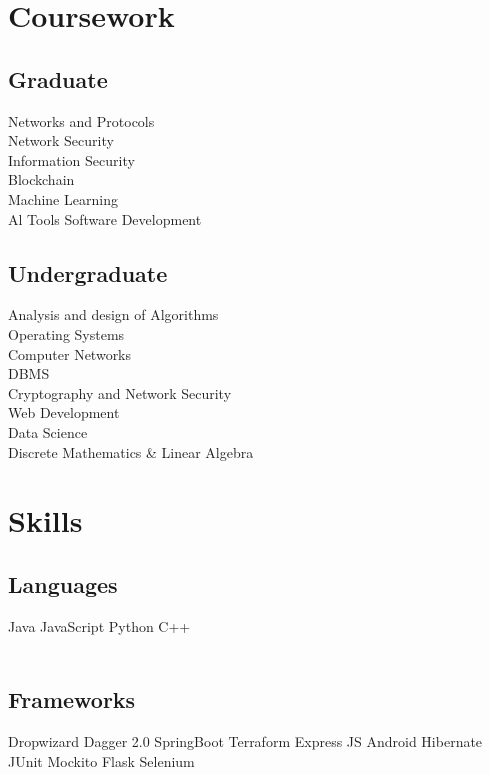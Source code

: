 \documentclass[]{resume-openfont}
\begin{document}
\begin{minipage}[t]{0.33\textwidth}

\section{Coursework}
\subsection{Graduate}
Networks and Protocols \\
Network Security \\
Information Security \\
Blockchain \\
Machine Learning \\
Al Tools Software Development \\
\sectionsep

\subsection{Undergraduate}
Analysis and design of Algorithms \\
Operating Systems \\
Computer Networks \\
DBMS \\
Cryptography and Network Security \\
Web Development \\
Data Science \\
Discrete Mathematics \& Linear Algebra \\


\section{Skills}
\subsection{Languages}
Java \textbullet{}   JavaScript \textbullet{} Python \textbullet{} C++ \\~\\
\subsection{Frameworks}
Dropwizard \textbullet{} Dagger 2.0 \textbullet{} SpringBoot \textbullet{} Terraform \textbullet{} Express JS \textbullet{} Android \textbullet{} Hibernate \textbullet{} JUnit \textbullet{} Mockito \textbullet{} Flask \textbullet{} Selenium \\~\\

\end{minipage}
\end{document}
